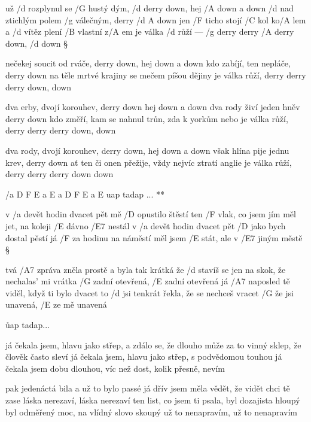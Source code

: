 
už /d rozplynul se /G hustý dým, /d derry down, hej /A down a down
/d nad ztichlým polem /g válečným, derry /{d A} down
jen /F ticho stojí /C kol ko/A lem a /d vítěz plení /B vlastní z/A em
je válka /d růží --- /g derry derry /A derry down, /d down \S

nečekej soucit od rváče, derry down, hej down a down
kdo zabíjí, ten nepláče, derry down
na těle mrtvé krajiny se mečem píšou dějiny
je válka růží, derry derry derry down, down \s

dva erby, dvojí korouhev, derry down hej down a down
dva rody živí jeden hněv derry down
kdo změří, kam se nahnul trůn, zda k yorkům nebo 
je válka růží, derry derry derry down, down \s

dva rody, dvojí korouhev, derry down, hej down a down
však hlína pije jednu krev, derry down
ať ten či onen přežije, vždy nejvíc ztratí anglie
je válka růží, derry derry derry down down




\R  /{a D F E a E a D F E a E} uap tadap ... **

v /a devět hodin dvacet pět mě /D opustilo štěstí
ten /F vlak, co jsem jím měl jet, na koleji /E dávno /E7 nestál
v /a devět hodin dvacet pět /D jako bych dostal pěstí
já /F za hodinu na náměstí měl jsem /E stát, ale v /E7 jiným městě \S

tvá /A7 zpráva zněla prostě a byla tak krátká
že /d stavíš se jen na skok, že nechalas' mi vrátka
/G zadní otevřená, /E zadní otevřená
já /A7 naposled tě viděl, když ti bylo dvacet
to /d jsi tenkrát řekla, že se nechceš vracet
/G že jsi unavená, /E ze mě unavená

\r uap tadap...

já čekala jsem, hlavu jako střep, a zdálo se, že dlouho
může za to vinný sklep, že člověk často sleví
já čekala jsem, hlavu jako střep, s podvědomou touhou
já čekala jsem dobu dlouhou, víc než dost, kolik přesně, nevím \s

pak jedenáctá bila a už to bylo passé
já dřív jsem měla vědět, že vidět chci tě zase
láska nerezaví, láska nerezaví
ten list, co jsem ti psala, byl dozajista hloupý
byl odměřený moc, na vlídný slovo skoupý
už to nenapravím, už to nenapravím

\rr




